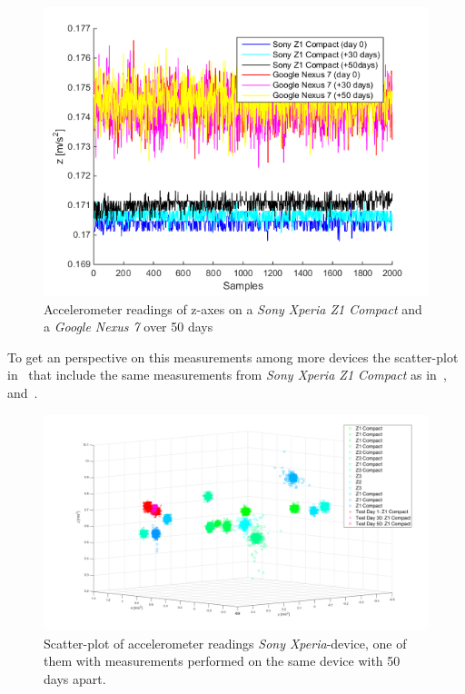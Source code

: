 \begin{figure}[ht]
	\centering
	\includegraphics[scale=.7]{img/sensrec-nex-z1-acc-z}
	\caption{Accelerometer readings of z-axes on a  \textit{Sony Xperia Z1 Compact} and a \textit{Google Nexus 7} over 50 days}
	\label{fig:z50days}
\end{figure}
To get an perspective on this measurements among more devices the scatter-plot in~ that include the same measurements from \textit{Sony Xperia Z1 Compact} as in~,~ and~.
\begin{figure}[ht]
	\centering
	\includegraphics[scale=.3]{img/senrec-sony_scatter-2}
	\caption{Scatter-plot of accelerometer readings \textit{Sony Xperia}-device, one of them with measurements performed on the same device with 50 days apart.}
	\label{fig:scatterSony50days}
\end{figure} 


